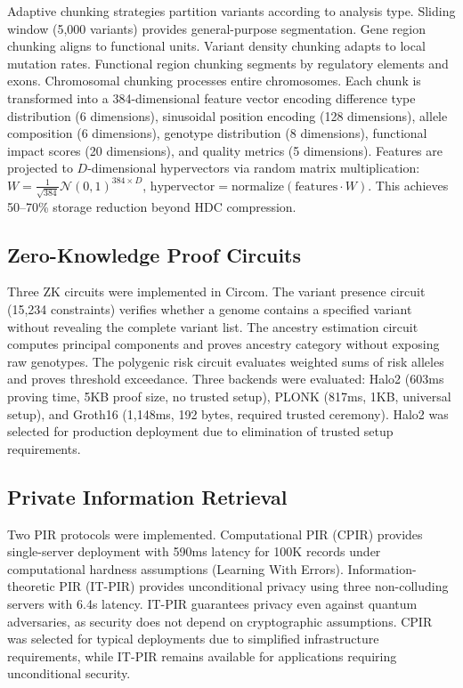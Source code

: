 \documentclass[11pt,letterpaper]{article}
\begin{document}
Adaptive chunking strategies partition variants according to analysis type. Sliding window (5,000 variants) provides general-purpose segmentation. Gene region chunking aligns to functional units. Variant density chunking adapts to local mutation rates. Functional region chunking segments by regulatory elements and exons. Chromosomal chunking processes entire chromosomes. Each chunk is transformed into a 384-dimensional feature vector encoding difference type distribution (6 dimensions), sinusoidal position encoding (128 dimensions), allele composition (6 dimensions), genotype distribution (8 dimensions), functional impact scores (20 dimensions), and quality metrics (5 dimensions). Features are projected to $D$-dimensional hypervectors via random matrix multiplication: $W = \frac{1}{\sqrt{384}} \mathcal{N}(0, 1)^{384 \times D}$, $\text{hypervector} = \text{normalize}(\text{features} \cdot W)$. This achieves 50--70\% storage reduction beyond HDC compression.

\subsection{Zero-Knowledge Proof Circuits}

Three ZK circuits were implemented in Circom. The variant presence circuit (15,234 constraints) verifies whether a genome contains a specified variant without revealing the complete variant list. The ancestry estimation circuit computes principal components and proves ancestry category without exposing raw genotypes. The polygenic risk circuit evaluates weighted sums of risk alleles and proves threshold exceedance. Three backends were evaluated: Halo2 (603ms proving time, 5KB proof size, no trusted setup), PLONK (817ms, 1KB, universal setup), and Groth16 (1,148ms, 192 bytes, required trusted ceremony). Halo2 was selected for production deployment due to elimination of trusted setup requirements.

\subsection{Private Information Retrieval}

Two PIR protocols were implemented. Computational PIR (CPIR) provides single-server deployment with 590ms latency for 100K records under computational hardness assumptions (Learning With Errors). Information-theoretic PIR (IT-PIR) provides unconditional privacy using three non-colluding servers with 6.4s latency. IT-PIR guarantees privacy even against quantum adversaries, as security does not depend on cryptographic assumptions. CPIR was selected for typical deployments due to simplified infrastructure requirements, while IT-PIR remains available for applications requiring unconditional security.
\end{document}
